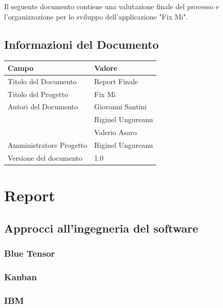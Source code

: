 \documentclass{report}
\begin{document}
	Il seguente documento contiene una valutazione finale del processo e l'organizzazione per lo sviluppo dell'applicazione "Fix Mi".
	
	\section{Informazioni del Documento}
	
	\begin{center} %
		\centering
		\begin{tabular}{ |p{4cm}|p{4cm}|  }
			\hline
			\centering Campo & \qquad\qquad Valore \\ %
			\hline
			Titolo del Documento & Report Finale \\
			\hline
			Titolo del Progetto & Fix Mi \\
			\hline
			Autori del Documento &
			Giovanni Santini \\ & Riginel Ungureanu \\ & Valerio Asaro \\
			\hline
			Amministratore Progetto & Riginel Ungureanu\\
			\hline
			Versione del documento & 1.0 \\
			\hline
		\end{tabular}
	\end{center}
	
	
	
\chapter{Report}

\section{Approcci all'ingegneria del software}

\subsection{Blue Tensor}

\subsection{Kanban}

\subsection{IBM}
\end{document}
